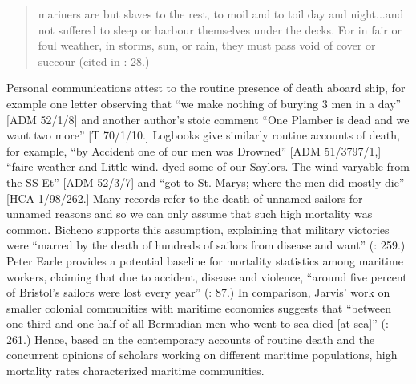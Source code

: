 \begin{quotation}
mariners are but slaves to the rest, to moil and to toil day and night...and not suffered to sleep or harbour themselves under the decks. For in fair or foul weather, in storms, sun, or rain, they must pass void of cover or succour (cited in \citealt{Lavery2009}: 28.) \end{quotation}

Personal communications attest to the routine presence of death aboard ship, for example one letter observing that “we make nothing of burying 3 men in a day” [ADM 52/1/8] and another author’s stoic comment “One Plamber is dead and we want two more” [T 70/1/10.] Logbooks give similarly routine accounts of death, for example, “by Accident one of our men was Drowned” [ADM 51/3797/1,] “faire weather and Little wind. dyed some of our Saylors. The wind varyable from the SS Et” [ADM 52/3/7] and “got to St. Marys; where the men did mostly die” [HCA 1/98/262.] Many records refer to the death of unnamed sailors for unnamed reasons and so we can only assume that such high mortality was common. Bicheno supports this assumption, explaining that  military victories were “marred by the death of hundreds of sailors from disease and want” (\citeyear*{Bicheno2012}: 259.) Peter Earle provides a potential baseline for mortality statistics among maritime workers, claiming that due to accident, disease and violence, “around five percent of Bristol’s sailors were lost every year” (\citeyear*{Earle1998}: 87.) In comparison, Jarvis’ work on smaller colonial communities with maritime economies suggests that “between one-third and one-half of all Bermudian men who went to sea died [at sea]” (: 261.) Hence, based on the contemporary accounts of routine death and the concurrent opinions of scholars working on different maritime populations, high mortality rates characterized maritime communities. 

